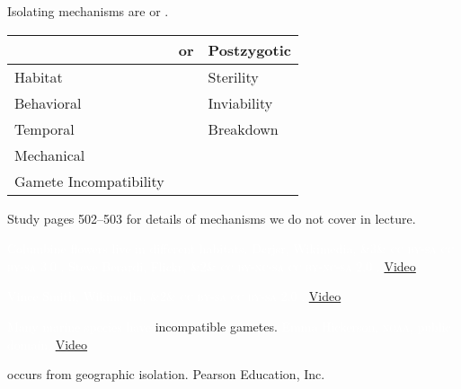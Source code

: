\documentclass[t]{beamer}
\newcommand{\ccbysa}[1]{%
	\ifx&#1&
	{\textsc{cc by-sa}}%
\else
	{\textsc{cc by-sa #1.0}} 
\fi}
\newcommand{\ccbyncsa}[1]{%
	\ifx&#1&
	{\textsc{cc by-nc-sa}}%
\else
	{\textsc{cc by-nc-sa #1.0}}
\fi}
\begin{document}
\begin{frame}{Isolating mechanisms are  or .}
	\vspace{2\baselineskip}
	\centering
	\begin{tabular}{l l l}
	\toprule
	{\large \highlight{Prezygotic}}	& or &	{\large Postzygotic}\\
	\midrule
	Habitat	& & Sterility \\
	Behavioral & &	Inviability \\
	Temporal	& &	Breakdown \\
	Mechanical 	& & 	\\
	Gamete Incompatibility	& & \\
	\bottomrule
	\end{tabular}

	\hangpara Study pages 502--503 for details of mechanisms we do not cover in lecture.
\end{frame}

{
\begin{frame}[b]{\textcolor{white}{Columbine flowers live in different \textcolor{orange5}{habitats.}} }
\tiny \textcolor{white}{Dcrjsr, Wikimedia, \ccbysa{3}. \hfill Steve Berardi, Flickr, \ccbyncsa{2}. \href{https://www.youtube.com/watch?v=Iwfs2TDYg-8}{Video}}
\end{frame}
}

{
\begin{frame}[b]{}
\hfill \tiny  \textcolor{white}{Vince Smith, Wikimedia, \ccbysa{2}. \href{https://www.youtube.com/watch?v=z922by9_6Fw}{Video} }
\end{frame}
}

{
\begin{frame}[b]{\textcolor{white}{Many marine species have} \textcolor{orange5}{incompatible gametes.}}
\tiny \textcolor{white}{Emma Hickerson, \textsc{noaa}, public domain. \href{https://www.youtube.com/watch?v=wsaZ8-I7akg}{Video}}
\end{frame}
}


{
\begin{frame}[b]{ occurs from geographic isolation.}
\hfill \tiny \textcopyright Pearson Education, Inc.
\end{frame}
}
\end{document}
